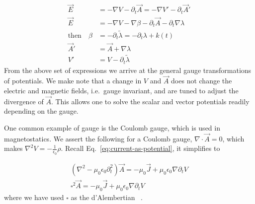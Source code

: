 \begin{align}
  \vec{E} &= -\nabla V - \partial_t \vec{A} = -\nabla V' - \partial_t \vec{A}' \nonumber \\
  \vec{E} &= -\nabla V - \nabla \beta - \partial_t \vec{A} - \partial_t \nabla \lambda \nonumber \\
  \text{then} \quad \beta &= -\partial_t \tilde{\lambda} = -\partial_t \lambda + k(t) \nonumber \\
  \vec{A}' &= \vec{A} + \nabla \lambda \\
  V' &= V - \partial_t \tilde{\lambda}
\end{align}
From the above set of expressions we arrive at the general gauge transformations of potentials.
We make note that a change in $V$ and $\vec{A}$ does not change the electric and magnetic fields, i.e.\ gauge invariant, and are tuned to adjust the divergence of $\vec{A}$.
This allows one to solve the scalar and vector potentials readily depending on the gauge.

One common example of gauge is the Coulomb gauge, which is used in magnetostatics.
We assert the following for a Coulomb gauge, $\nabla \cdot \vec{A} = 0$, which makes $\nabla^2 V = -\tfrac{1}{\epsilon_0} \rho$.
Recall Eq.~\eqref{eq:current-as-potential}, it simplifies to

\begin{align}
  \left(\nabla^2 - \mu_0 \epsilon_0 \partial_t^2 \right) \vec{A} = -\mu_0 \vec{J} + \mu_0 \epsilon_0 \nabla \partial_t V \nonumber \\
  \square^2 \vec{A} = -\mu_0 \vec{J} + \mu_0 \epsilon_0 \nabla \partial_t V
\end{align}
where we have used $\square$ as the d'Alembertian  ~\cite{griffithsIntroductionElectrodynamics2024}.

